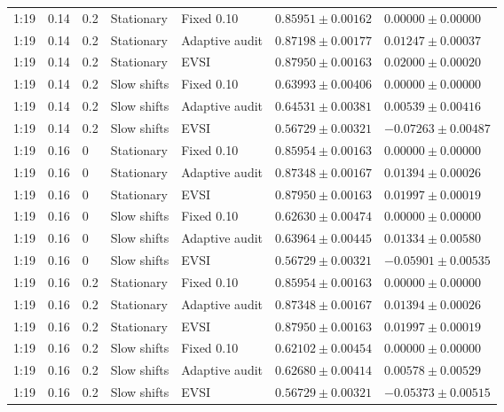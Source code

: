 \begin{longtable}{@{}lllllll@{}}
1:19 & 0.14 & 0.2 & Stationary & Fixed 0.10 & $0.85951 \pm 0.00162$ & $0.00000 \pm 0.00000$ \\
1:19 & 0.14 & 0.2 & Stationary & Adaptive audit & $0.87198 \pm 0.00177$ & $0.01247 \pm 0.00037$ \\
1:19 & 0.14 & 0.2 & Stationary & EVSI & $0.87950 \pm 0.00163$ & $0.02000 \pm 0.00020$ \\
1:19 & 0.14 & 0.2 & Slow shifts & Fixed 0.10 & $0.63993 \pm 0.00406$ & $0.00000 \pm 0.00000$ \\
1:19 & 0.14 & 0.2 & Slow shifts & Adaptive audit & $0.64531 \pm 0.00381$ & $0.00539 \pm 0.00416$ \\
1:19 & 0.14 & 0.2 & Slow shifts & EVSI & $0.56729 \pm 0.00321$ & $-0.07263 \pm 0.00487$ \\
1:19 & 0.16 & 0 & Stationary & Fixed 0.10 & $0.85954 \pm 0.00163$ & $0.00000 \pm 0.00000$ \\
1:19 & 0.16 & 0 & Stationary & Adaptive audit & $0.87348 \pm 0.00167$ & $0.01394 \pm 0.00026$ \\
1:19 & 0.16 & 0 & Stationary & EVSI & $0.87950 \pm 0.00163$ & $0.01997 \pm 0.00019$ \\
1:19 & 0.16 & 0 & Slow shifts & Fixed 0.10 & $0.62630 \pm 0.00474$ & $0.00000 \pm 0.00000$ \\
1:19 & 0.16 & 0 & Slow shifts & Adaptive audit & $0.63964 \pm 0.00445$ & $0.01334 \pm 0.00580$ \\
1:19 & 0.16 & 0 & Slow shifts & EVSI & $0.56729 \pm 0.00321$ & $-0.05901 \pm 0.00535$ \\
1:19 & 0.16 & 0.2 & Stationary & Fixed 0.10 & $0.85954 \pm 0.00163$ & $0.00000 \pm 0.00000$ \\
1:19 & 0.16 & 0.2 & Stationary & Adaptive audit & $0.87348 \pm 0.00167$ & $0.01394 \pm 0.00026$ \\
1:19 & 0.16 & 0.2 & Stationary & EVSI & $0.87950 \pm 0.00163$ & $0.01997 \pm 0.00019$ \\
1:19 & 0.16 & 0.2 & Slow shifts & Fixed 0.10 & $0.62102 \pm 0.00454$ & $0.00000 \pm 0.00000$ \\
1:19 & 0.16 & 0.2 & Slow shifts & Adaptive audit & $0.62680 \pm 0.00414$ & $0.00578 \pm 0.00529$ \\
1:19 & 0.16 & 0.2 & Slow shifts & EVSI & $0.56729 \pm 0.00321$ & $-0.05373 \pm 0.00515$ \\
\end{longtable}\endgroup
\clearpage
